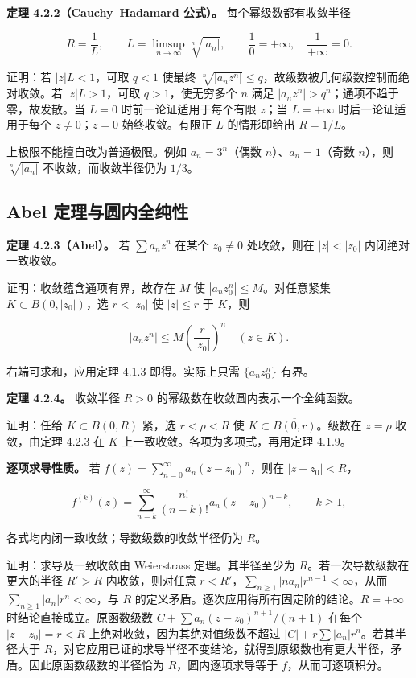 \documentclass[11pt,a4paper]{article}
\begin{document}
\textbf{定理 4.2.2（Cauchy--Hadamard 公式）。} 每个幂级数都有收敛半径

\[
R=\frac1L,\qquad L=\limsup_{n\to\infty}\sqrt[n]{|a_n|},
\qquad \frac10=+\infty,\quad \frac1{+\infty}=0.
\]

证明：若 \(|z|L<1\)，可取 \(q<1\) 使最终
\(\sqrt[n]{|a_nz^n|}\le q\)，故级数被几何级数控制而绝对收敛。若
\(|z|L>1\)，可取 \(q>1\)，使无穷多个 \(n\) 满足
\(|a_nz^n|>q^n\)；通项不趋于零，故发散。当 \(L=0\)
时前一论证适用于每个有限 \(z\)；当 \(L=+\infty\) 时后一论证适用于每个
\(z\ne0\)；\(z=0\) 始终收敛。有限正 \(L\) 的情形即给出 \(R=1/L\)。

上极限不能擅自改为普通极限。例如 \(a_n=3^n\)（偶数
\(n\)）、\(a_n=1\)（奇数 \(n\)），则 \(\sqrt[n]{|a_n|}\)
不收敛，而收敛半径仍为 \(1/3\)。

\subsection{Abel 定理与圆内全纯性}\label{ch04-s2-heading-2}

\textbf{定理 4.2.3（Abel）。} 若 \(\sum a_nz^n\) 在某个 \(z_0\ne0\)
处收敛，则在 \(|z|<|z_0|\) 内闭绝对一致收敛。

证明：收敛蕴含通项有界，故存在 \(M\) 使 \(|a_nz_0^n|\le M\)。对任意紧集
\(K\subset B(0,|z_0|)\)，选 \(r<|z_0|\) 使 \(|z|\le r\) 于 \(K\)，则

\[
|a_nz^n|\le M\left(\frac r{|z_0|}\right)^n\quad(z\in K).
\]

右端可求和，应用定理 4.1.3 即得。实际上只需 \(\{a_nz_0^n\}\) 有界。

\textbf{定理 4.2.4。} 收敛半径 \(R>0\)
的幂级数在收敛圆内表示一个全纯函数。

证明：任给 \(K\subset B(0,R)\) 紧，选 \(r<\rho<R\) 使
\(K\subset\overline{B(0,r)}\)。级数在 \(z=\rho\) 收敛，由定理 4.2.3 在
\(K\) 上一致收敛。各项为多项式，再用定理 4.1.9。

\textbf{逐项求导性质。} 若
\(f(z)=\sum_{n=0}^{\infty}a_n(z-z_0)^n\)，则在 \(|z-z_0|<R\)，

\[
f^{(k)}(z)=\sum_{n=k}^{\infty}\frac{n!}{(n-k)!}a_n(z-z_0)^{n-k},\qquad k\ge1,
\]

各式均内闭一致收敛；导数级数的收敛半径仍为 \(R\)。

证明：求导及一致收敛由 Weierstrass 定理。其半径至少为
\(R\)。若一次导数级数在更大的半径 \(R'>R\) 内收敛，则对任意
\(r<R'\)，\(\sum_{n\ge1}|na_n|r^{n-1}<\infty\)，从而
\(\sum_{n\ge1}|a_n|r^n<\infty\)，与 \(R\)
的定义矛盾。逐次应用得所有固定阶的结论。\(R=+\infty\)
时结论直接成立。原函数级数 \(C+\sum a_n(z-z_0)^{n+1}/(n+1)\) 在每个
\(|z-z_0|=r<R\) 上绝对收敛，因为其绝对值级数不超过
\(|C|+r\sum|a_n|r^n\)。若其半径大于
\(R\)，对它应用已证的求导半径不变结论，就得到原级数也有更大半径，矛盾。因此原函数级数的半径恰为
\(R\)，圆内逐项求导等于 \(f\)，从而可逐项积分。
\end{document}
